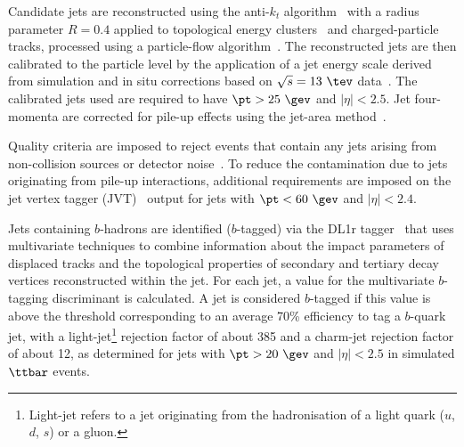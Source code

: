 Candidate jets are reconstructed using the anti-$k_t$ algorithm~\cite{Cacciari:2008gp,Cacciari:2005hq} with a
radius parameter $R=0.4$ applied to topological energy clusters~\cite{Aad:2016upy} and charged-particle tracks, processed using
a particle-flow algorithm~\cite{Aad:2017epj77}. %
The reconstructed jets are then calibrated to the particle level by the application of a jet energy scale 
derived from simulation and in situ corrections based on $\sqrt{s}=13~\tev$ data~\cite{Aaboud:2017jcu}. %
The calibrated jets used are required to have $\pt > 25~\gev$ and $|\eta| < 2.5$.
Jet four-momenta are corrected for pile-up effects using the jet-area method~\cite{Cacciari:2008gn}.

Quality criteria are imposed to reject events that contain any jets arising from non-collision sources
or detector noise~\cite{ATLAS-CONF-2015-029}.  To reduce the contamination due to jets originating from pile-up interactions,
additional requirements are imposed on the jet vertex tagger (JVT)~\cite{Aad:2015ina} output for jets with $\pt<60~\gev$ and $|\eta| < 2.4$.

Jets containing $b$-hadrons are identified ($b$-tagged) via the DL1r tagger~\cite{Aad:2019epj79,ATL-PHYS-PUB-2017-013} %
that uses multivariate techniques to combine information about the impact parameters of displaced tracks and the  topological properties 
of secondary and tertiary decay vertices reconstructed within the jet. For each jet, a value for the multivariate $b$-tagging discriminant is 
calculated. A jet is considered $b$-tagged if this value is above the threshold corresponding to
an average 70\% efficiency to tag a $b$-quark jet, with a light-jet\footnote{Light-jet refers to a jet originating from the hadronisation of a light quark ($u$, $d$, $s$) or a gluon.} rejection factor of about 385 and a charm-jet rejection factor of about 12, as determined for jets with
$\pt >20~\gev$ and $|\eta|<2.5$ in simulated $\ttbar$ events.

